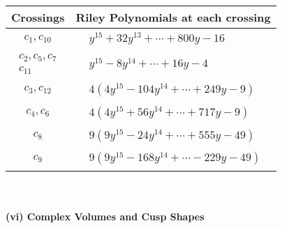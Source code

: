 \documentclass[1p]{elsarticle_modified}
\theoremstyle{definition}
\begin{document}
\begin{tabular}{m{50pt}|m{274pt}}
Crossings & \hspace{64pt}Riley Polynomials at each crossing \\
\hline $$\begin{aligned}c_{1},c_{10}\end{aligned}$$&$\begin{aligned}
&y^{15}+32 y^{13}+\cdots+800 y-16
\end{aligned}$\\
\hline $$\begin{aligned}c_{2},c_{5},c_{7}\\c_{11}\end{aligned}$$&$\begin{aligned}
&y^{15}-8 y^{14}+\cdots+16 y-4
\end{aligned}$\\
\hline $$\begin{aligned}c_{3},c_{12}\end{aligned}$$&$\begin{aligned}
&4(4 y^{15}-104 y^{14}+\cdots+249 y-9)
\end{aligned}$\\
\hline $$\begin{aligned}c_{4},c_{6}\end{aligned}$$&$\begin{aligned}
&4(4 y^{15}+56 y^{14}+\cdots+717 y-9)
\end{aligned}$\\
\hline $$\begin{aligned}c_{8}\end{aligned}$$&$\begin{aligned}
&9(9 y^{15}-24 y^{14}+\cdots+555 y-49)
\end{aligned}$\\
\hline $$\begin{aligned}c_{9}\end{aligned}$$&$\begin{aligned}
&9(9 y^{15}-168 y^{14}+\cdots-229 y-49)
\end{aligned}$\\
\hline
\end{tabular}\\~\\
\newpage\flushleft \textbf{(vi) Complex Volumes and Cusp Shapes}
\end{document}
